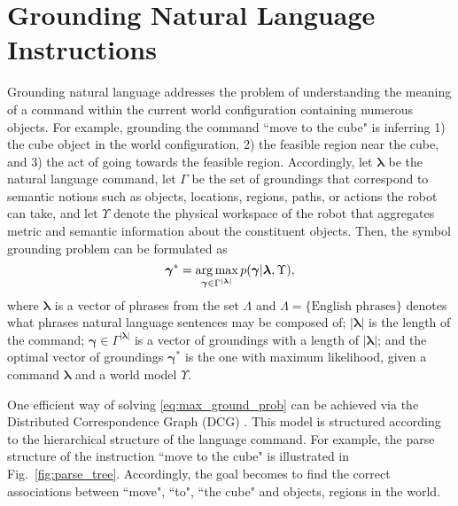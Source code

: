 \section{Grounding Natural Language Instructions}
\label{sec:background}
Grounding natural language addresses the problem of understanding the meaning of a command within the current world configuration containing numerous objects. For example, grounding the command ``move to the cube" is inferring 1) the cube object in the world configuration, 2) the feasible region near the cube, and 3) the act of going towards the feasible region. Accordingly, let $\boldsymbol{\lambda}$ be the natural language command, let $\Gamma$ be the set of groundings that correspond to semantic notions such as objects, locations, regions, paths, or actions the robot can take, and let $\Upsilon$ denote the physical workspace of the robot that aggregates metric and semantic information about the constituent objects. Then, the symbol grounding problem can be formulated as %
\begin{equation}
\boldsymbol{\gamma}^* = \operatorname*{\arg\max}_{\boldsymbol{\gamma} \in \Gamma^{|\boldsymbol{\lambda}|}} p(\boldsymbol{\gamma}|\boldsymbol{\lambda},\Upsilon),
\label{eq:max_ground_prob}
\end{equation}
where $\boldsymbol{\lambda}$ is a vector of phrases from the set $\Lambda$ and ${\Lambda = \{\text{English phrases}\}}$ denotes what phrases natural language sentences may be composed of; $|\boldsymbol{\lambda}|$ is the length of the command; $\boldsymbol{\gamma} \in \Gamma^{|\boldsymbol{\lambda}|}$ is a vector of groundings with a length of $|\boldsymbol{\lambda}|$; and the optimal vector of groundings $\boldsymbol{\gamma}^*$ is the one with maximum likelihood, given a command $\boldsymbol{\lambda}$ and a world model $\Upsilon$.

One efficient way of solving \eqref{eq:max_ground_prob} can be achieved via the Distributed Correspondence Graph (DCG) \cite{dcg}. This model is structured according to the hierarchical structure of the language command. For example, the parse structure of the instruction ``move to the cube" is illustrated in Fig.~\ref{fig:parse_tree}. Accordingly, the goal becomes to find the correct associations between ``move", ``to", ``the cube" and objects, regions in the world. 


